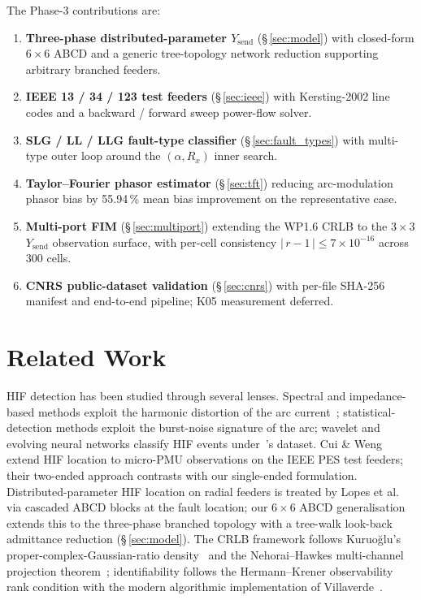 \documentclass[conference]{IEEEtran}
\newcommand{\headlineKSixImp}{55.94\,\% mean bias improvement}
\newcommand{\headlineKSevenConsist}%
  {$|\,r-1\,| \leq 7\!\times\!10^{-16}$ across 300 cells}
\begin{document}
The Phase-3 contributions are:
\begin{enumerate}
\item \textbf{Three-phase distributed-parameter $Y_\mathrm{send}$}
      (\S\,\ref{sec:model}) with closed-form $6\!\times\!6$ ABCD
      and a generic tree-topology network reduction supporting
      arbitrary branched feeders.
\item \textbf{IEEE 13 / 34 / 123 test feeders}
      (\S\,\ref{sec:ieee}) with Kersting-2002 line codes and a
      backward / forward sweep power-flow solver.
\item \textbf{SLG / LL / LLG fault-type classifier}
      (\S\,\ref{sec:fault_types}) with multi-type outer loop
      around the $(\alpha, R_x)$ inner search.
\item \textbf{Taylor--Fourier phasor estimator}
      (\S\,\ref{sec:tft}) reducing arc-modulation phasor bias by
      \headlineKSixImp{} on the representative case.
\item \textbf{Multi-port FIM}
      (\S\,\ref{sec:multiport}) extending the WP1.6 CRLB to the
      $3\!\times\!3$ $Y_\mathrm{send}$ observation surface, with
      per-cell consistency \headlineKSevenConsist{}.
\item \textbf{CNRS public-dataset validation}
      (\S\,\ref{sec:cnrs}) with per-file SHA-256 manifest and
      end-to-end pipeline; K05 measurement deferred.
\end{enumerate}

\section{Related Work}\label{sec:related}
HIF detection has been studied through several lenses.  Spectral and
impedance-based methods exploit the harmonic distortion of the arc
current~\cite{Penaloza2023EPSR}; statistical-detection methods
exploit the burst-noise signature of the arc; wavelet and evolving
neural networks classify HIF events
under~\cite{PereiraDeSouza2024CNRS}'s dataset.  Cui \&
Weng~\cite{CuiWeng2020TSG} extend HIF location to micro-PMU
observations on the IEEE PES test feeders; their two-ended approach
contrasts with our single-ended formulation.  Distributed-parameter
HIF location on radial feeders is treated by Lopes et
al.~\cite{Lopes2023DPM} via cascaded ABCD blocks at the fault location;
our $6 \times 6$ ABCD generalisation extends this to the three-phase
branched topology with a tree-walk look-back admittance reduction
(\S\,\ref{sec:model}).  The CRLB framework follows
Kuruo\u{g}lu's proper-complex-Gaussian-ratio
density~\cite{Kuruoglu2018ASCE} and the Nehorai--Hawkes
multi-channel projection theorem~\cite{NehoraiHawkes2000};
identifiability follows the Hermann--Krener observability rank
condition with the modern algorithmic implementation of
Villaverde~\cite{Villaverde2024STRIKEGOLDD}.
\end{document}
